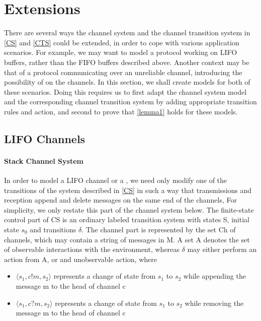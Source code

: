\section{Extensions}
\label{extensions}
There are several ways the channel system and the channel transition system in \ref{CS} and \ref{CTS} could be extended, in order to cope with various application scenarios. For example, we may want to model a protocol working on LIFO buffers, rather than the FIFO buffers described above. Another context may be that of a protocol communicating over an unreliable channel, introducing the possibility of  on the channels. In this section, we shall create models for both of these scenarios. Doing this requires us to first adapt the channel system model and the corresponding channel transition system by adding appropriate transition rules and action, and second to prove that \ref{lemma1} holds for these models.

\subsection{LIFO Channels}
\paragraph{Stack Channel System}
\label{StackCS}
In order to model a LIFO channel or a , we need only modify one of the transitions of the system described in \ref{CS} in such a way that transmissions and reception append and delete messages on the same end of the channels, For simplicity, we only restate this part of the channel system below. The finite-state control part of CS is an ordinary labeled transition system with states S, initial state $s_0$ and transitions $\delta$. The channel part is represented by the set Ch of channels, which may contain a string of messages in M. A set A denotes the set of observable interactions with the environment, whereas $\delta$ may either perform an action from A, or and unobservable action, where

\begin{itemize}
\item[]
$\langle s_1, c!m, s_2\rangle$ represents a change of state from $s_1$ to $s_2$ while appending the message m to the head of channel c
\item[]
$\langle s_1, c?m, s_2\rangle$ represents a change of state from $s_1$ to $s_2$ while removing the message m to the head of channel c
\end{itemize}

